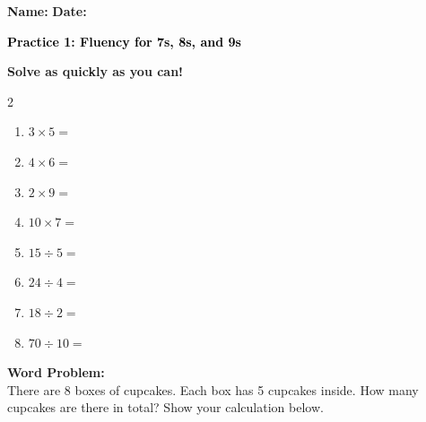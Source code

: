 \documentclass[12pt, letterpaper, fleqn]{article}
\newcommand{\blank}{\underline{\hspace{2.2cm}}}
\begin{document}
\textbf{Name:} \underline{\hspace{5cm}}
\hfill
\textbf{Date:} \underline{\hspace{3cm}}\\

\begin{tcolorbox}[colback=customteal!20]
    \large\textcolor{black}{\textbf{Practice 1: Fluency for 7s, 8s, and 9s}}
\end{tcolorbox}

\vspace{5mm}
\noindent
\textbf{Solve as quickly as you can!}

\vspace{5mm}
\begin{multicols}{2}
\begin{enumerate}[itemsep=1.2cm]
\item $3 \times 5 =$ \blank
\item $4 \times 6 =$ \blank
\item $2 \times 9 =$ \blank
\item $10 \times 7 =$ \blank
\item $15 \div 5 =$ \blank
\item $24 \div 4 =$ \blank
\item $18 \div 2 =$ \blank
\item $70 \div 10 =$ \blank
\end{enumerate}
\end{multicols}

\vspace{1.5cm}
\noindent
\textbf{Word Problem:}
\\
\noindent
There are 8 boxes of cupcakes. Each box has 5 cupcakes inside. How many cupcakes are there in total? Show your calculation below.
\vspace{3cm}
\end{document}
